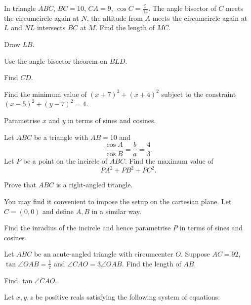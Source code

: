 \documentclass[../jarvis.tex]{subfiles}
\begin{document}
\problem[2019 SMO(O) P18] In triangle $ABC$, $BC=10$, $CA=9$, $\cos{C}=\frac{5}{14}$. The angle bisector of $C$ meets the circumcircle again at $N$, the altitude from $A$ meets the circumcircle again at $L$ and $NL$ intersects $BC$ at $M$. Find the length of $MC$.
\begin{hints}
    \begin{hint}
        Draw $LB$.
    \end{hint}
    \begin{hint}
        Use the angle bisector theorem on $BLD$.
    \end{hint}
    \begin{hint}
        Find $CD$.
    \end{hint}
\end{hints} 
\problem[2021 SMO(O) P8] Find the minimum value of $(x+7)^2+(x+4)^2$ subject to the constraint $(x-5)^2+(y-7)^2=4$.
\begin{hints}
    \begin{hint}
        Parametrise $x$ and $y$ in terms of sines and cosines.
    \end{hint}
\end{hints}
\problem[2021 SMO(O) P18] Let $ABC$ be a triangle with $AB=10$ and
$$\frac{\cos{A}}{\cos{B}}=\frac{b}{a}=\frac{4}{3}.$$
Let $P$ be a point on the incircle of $ABC$. Find the maximum value of $$PA^2+PB^2+PC^2.$$
\begin{hints}
    \begin{hint}
        Prove that $ABC$ is a right-angled triangle.
    \end{hint}
    \begin{hint}
        You may find it convenient to impose the setup on the cartesian plane. Let $C=(0,0)$ and define $A,B$ in a similar way.
    \end{hint}
    \begin{hint}
        Find the inradius of the incircle and hence parametrise $P$ in terms of sines and cosines.
    \end{hint}
\end{hints}
\problem[2016 SMO(O) P23]Let $ABC$ be an acute-angled triangle with circumcenter $O$. Suppose $AC=92$, $\tan{\angle OAB}=\frac{1}{7}$ and $\angle CAO=3\angle OAB$. Find the length of $AB$.
\begin{hints}
    \begin{hint}
        Find $\tan{\angle CAO}$.
    \end{hint}
\end{hints}
\problem[2022 AIME I/15] Let $x,y,z$ be positive reals satisfying the following system of equations:
\end{document}
